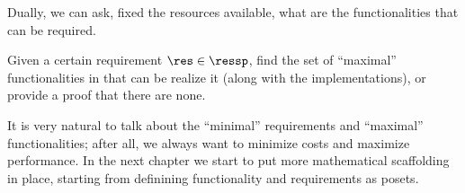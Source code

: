 Dually, we can ask, fixed the resources available, what are the functionalities that can be required.

\begin{problem}[FixReqMinFun]
    Given a certain requirement $\res\in\ressp$, find the set of ``maximal'' functionalities in that can be realize it (along with the implementations), or provide a proof that there are none. 
\end{problem}


It is very natural to talk about the ``minimal'' requirements and ``maximal'' functionalities;
after all, we always want to minimize costs and maximize performance. In the next chapter
we start to put more mathematical scaffolding in place, starting from definining functionality
and requirements as posets.

    



